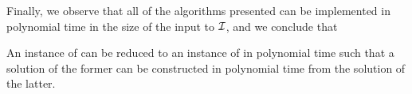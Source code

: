     Finally, we observe that all of the algorithms presented can be implemented in polynomial time in the size of the input to $\mbox{${\mathcal I}$}$, and we conclude that
    \begin{theorem}
An instance of \TwoDContractionMap can be reduced to an instance of \EOPL in polynomial time such that a solution of the former can be constructed in polynomial time from the solution of the latter. 
    \end{theorem}

    
  






  